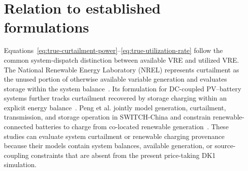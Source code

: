 \documentclass[11pt,a4paper]{article}
\begin{document}
\section{Relation to established formulations}

Equations~\eqref{eq:true-curtailment-power}--\eqref{eq:true-utilization-rate} follow the common system-dispatch distinction between available VRE and utilized VRE. The National Renewable Energy Laboratory (NREL) represents curtailment as the unused portion of otherwise available variable generation and evaluates storage within the system balance~\cite{nrel2016storage}. Its formulation for DC-coupled PV--battery systems further tracks curtailment recovered by storage charging within an explicit energy balance~\cite{nrel2021pvb}. Peng et al. jointly model generation, curtailment, transmission, and storage operation in SWITCH-China and constrain renewable-connected batteries to charge from co-located renewable generation~\cite{peng2023heterogeneous}. These studies can evaluate system curtailment or renewable charging provenance because their models contain system balances, available generation, or source-coupling constraints that are absent from the present price-taking DK1 simulation.
\end{document}
